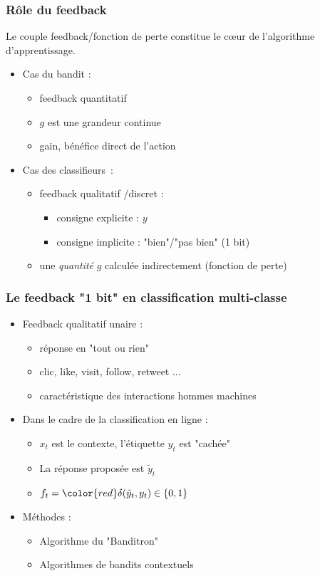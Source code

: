 \documentclass{beamer}
\begin{document}
\begin{frame}\frametitle{Rôle du feedback}
	\begin{block}{}
		Le couple feedback/fonction de perte constitue le cœur de l'algorithme d'apprentissage.
	\end{block}
 \begin{itemize}
 	\item Cas du bandit : 
 	\begin{itemize}
 		\item feedback quantitatif 
 		\item $g$ est une grandeur continue
 		\item gain, bénéfice direct de l'action
 	\end{itemize}
 	\item Cas des classifieurs~:
 	\begin{itemize}
 		\item feedback qualitatif /discret :
 		\begin{itemize}
 			\item consigne explicite : $y$
 			\item consigne implicite : "bien"/"pas bien" (1 bit)
 		\end{itemize}
 		\item une \textit{quantité} $g$ calculée indirectement (fonction de perte)
 	\end{itemize}
 \end{itemize}
 
 
 
\end{frame}


\begin{frame}
	\frametitle{Le feedback "1 bit" en classification multi-classe}
	
	\begin{itemize}
		\item Feedback qualitatif unaire :
		\begin{itemize}
			\item réponse en "tout ou rien"
			\item clic, like, visit, follow, retweet ...
			\item caractéristique des interactions hommes machines
		\end{itemize}
		\item Dans le cadre de la classification en ligne : 
		\begin{itemize}
			\item $x_t$ est le contexte, l'étiquette $y_t$ est "cachée"
			\item La réponse proposée est $\tilde{y}_t$
			\item $f_t = {\color{red}\delta(\tilde{y}_t ,y_t)} \in \{0,1\}$
		\end{itemize}
		\item Méthodes :
		\begin{itemize}
			\item Algorithme du "Banditron" \cite{kakade2008efficient}
			\item Algorithmes de bandits contextuels
		\end{itemize}
	\end{itemize}
\end{frame}
\end{document}
